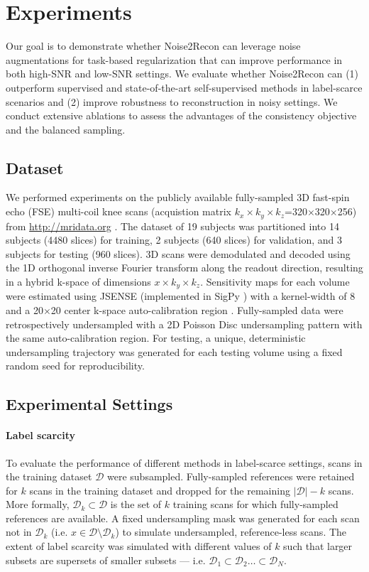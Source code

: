 \documentclass[10pt,twocolumn,letterpaper]{article}
\begin{document}
\section{Experiments}
Our goal is to demonstrate whether Noise2Recon can leverage noise augmentations for task-based regularization that can improve performance in both high-SNR and low-SNR settings. We evaluate whether Noise2Recon can (1) outperform supervised and state-of-the-art self-supervised methods in label-scarce scenarios and (2) improve robustness to reconstruction in noisy settings. We conduct extensive ablations to assess the advantages of the consistency objective and the balanced sampling.

\subsection{Dataset}
\label{sec:dataset}
We performed experiments on the publicly available fully-sampled 3D fast-spin echo (FSE) multi-coil knee scans (acquistion matrix $k_x \times k_y \times k_z$=320$\times$320$\times$256) from \url{http://mridata.org} \cite{ong2018mridata}. The dataset of 19 subjects was partitioned into 14 subjects (4480 slices) for training, 2 subjects (640 slices) for validation, and 3 subjects for testing (960 slices). 3D scans were demodulated and decoded using the 1D orthogonal inverse Fourier transform along the readout direction, resulting in a hybrid k-space of dimensions $x \times k_y \times k_z$. Sensitivity maps for each volume were estimated using JSENSE (implemented in SigPy \cite{sigpy}) with a kernel-width of 8 and a 20$\times$20 center k-space auto-calibration region \cite{ying2007joint}. Fully-sampled data were retrospectively undersampled with a 2D Poisson Disc undersampling pattern with the same auto-calibration region. For testing, a unique, deterministic undersampling trajectory was generated for each testing volume using a fixed random seed for reproducibility.

\subsection{Experimental Settings}
\label{sec:methods-simulations}
\paragraph{Label scarcity} To evaluate the performance of different methods in label-scarce settings, scans in the training dataset $\mathcal{D}$ were subsampled. Fully-sampled references were retained for $k$ scans in the training dataset and dropped for the remaining $|\mathcal{D}|-k$ scans. More formally, $\mathcal{D}_k \subset \mathcal{D}$ is the set of $k$ training scans for which fully-sampled references are available. A fixed undersampling mask was generated for each scan not in $\mathcal{D}_k$ (i.e. $ x \in \mathcal{D} \setminus \mathcal{D}_k$) to simulate undersampled, reference-less scans. The extent of label scarcity was simulated with different values of $k$ such that larger subsets are supersets of smaller subsets --- i.e. $\mathcal{D}_1 \subset \mathcal{D}_2 \dots \subset \mathcal{D}_N$.
\end{document}
